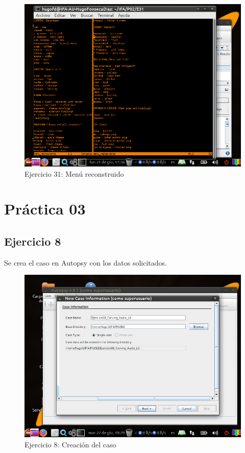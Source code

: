 \documentclass[11pt]{article}
\begin{document}
\begin{figure}[H]
    \caption{Ejercicio 31: Menú reconstruido}
  \centering
  \includegraphics[scale=0.7]{p02/e31-7.png}
\end{figure}



\section{Práctica 03}

\subsection{Ejercicio 8}
Se crea el caso en Autopsy con los datos solicitados.

\begin{figure}[H]
    \caption{Ejercicio 8: Creación del caso}
    \centering
    \includegraphics[scale=0.7]{p03/e8-1.png}
\end{figure}
\end{document}
